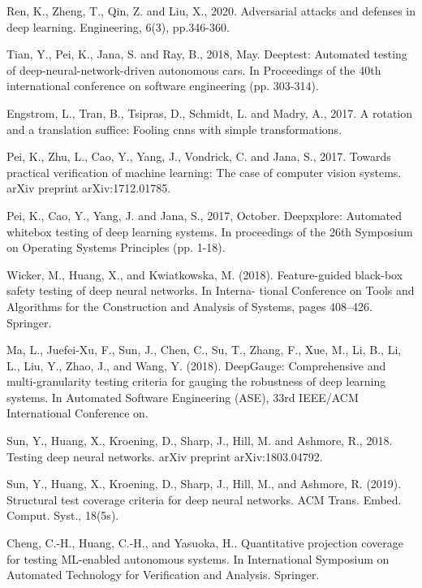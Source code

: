 \begin{singlespace}
\begin{thebibliography}{}
Ren, K., Zheng, T., Qin, Z. and Liu, X., 2020. Adversarial attacks and defenses in deep learning. Engineering, 6(3), pp.346-360.

Tian, Y., Pei, K., Jana, S. and Ray, B., 2018, May. Deeptest: Automated testing of deep-neural-network-driven autonomous cars. In Proceedings of the 40th international conference on software engineering (pp. 303-314).


Engstrom, L., Tran, B., Tsipras, D., Schmidt, L. and Madry, A., 2017. A rotation and a translation suffice: Fooling cnns with simple transformations.

Pei, K., Zhu, L., Cao, Y., Yang, J., Vondrick, C. and Jana, S., 2017. Towards practical verification of machine learning: The case of computer vision systems. arXiv preprint arXiv:1712.01785.

  
 Pei, K., Cao, Y., Yang, J. and Jana, S., 2017, October. Deepxplore: Automated whitebox testing of deep learning systems. In proceedings of the 26th Symposium on Operating Systems Principles (pp. 1-18).

 Wicker, M., Huang, X., and Kwiatkowska, M. (2018). Feature-guided black-box safety testing of deep neural networks. In Interna- tional Conference on Tools and Algorithms for the Construction and Analysis of Systems, pages 408–426. Springer.

 Ma, L., Juefei-Xu, F., Sun, J., Chen, C., Su, T., Zhang, F., Xue, M., Li, B., Li, L., Liu, Y., Zhao, J., and Wang, Y. (2018). DeepGauge: Comprehensive and multi-granularity testing criteria for gauging the robustness of deep learning systems. In Automated Software Engineering (ASE), 33rd IEEE/ACM International Conference on.

    
Sun, Y., Huang, X., Kroening, D., Sharp, J., Hill, M. and Ashmore, R., 2018. Testing deep neural networks. arXiv preprint arXiv:1803.04792.

 Sun, Y., Huang, X., Kroening, D., Sharp, J., Hill, M., and Ashmore, R. (2019). Structural test coverage criteria for deep neural networks. ACM Trans. Embed. Comput. Syst., 18(5s).

Cheng, C.-H., Huang, C.-H., and Yasuoka, H.. Quantitative projection coverage for testing ML-enabled autonomous systems. In International Symposium on Automated Technology for Verification and Analysis. Springer.


\end{thebibliography}
\end{singlespace}
